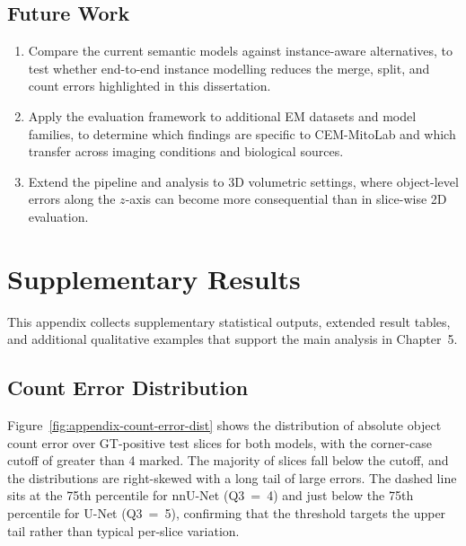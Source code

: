 \documentclass[logo,bsc,singlespacing,parskip,online]{infthesis}
\begin{document}
\section{Future Work}

\begin{enumerate}
  \item Compare the current semantic models against instance-aware
  alternatives, to test whether end-to-end instance modelling reduces the merge,
  split, and count errors highlighted in this dissertation.

  \item Apply the evaluation framework to additional EM datasets and model
  families, to determine which findings are specific to CEM-MitoLab and which
  transfer across imaging conditions and biological sources.

  \item Extend the pipeline and analysis to 3D volumetric settings, where
  object-level errors along the $z$-axis can become more consequential than in
  slice-wise 2D evaluation.
\end{enumerate}

% 




\appendix

\chapter{Supplementary Results}

This appendix collects supplementary statistical outputs, extended result
tables, and additional qualitative examples that support the main analysis in
Chapter~5.

\section{Count Error Distribution}

Figure~\ref{fig:appendix-count-error-dist} shows the distribution of absolute
object count error over GT-positive test slices for both models, with the
corner-case cutoff of greater than 4 marked. The majority of slices fall below
the cutoff, and the distributions are right-skewed with a long tail of large
errors. The dashed line sits at the 75th percentile for nnU-Net (Q3~=~4) and
just below the 75th percentile for U-Net (Q3~=~5), confirming that the
threshold targets the upper tail rather than typical per-slice variation.
\end{document}
